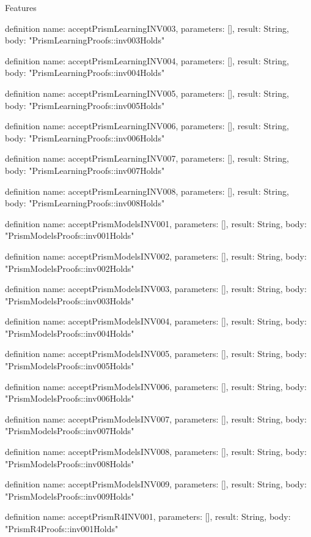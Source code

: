 \begin{lexlean}{Features}
\begin{semanticmodule}
definition{
  name: acceptPrismLearningINV003,
  parameters: [],
  result: String,
  body: "PrismLearningProofs::inv003Holds"
}

definition{
  name: acceptPrismLearningINV004,
  parameters: [],
  result: String,
  body: "PrismLearningProofs::inv004Holds"
}

definition{
  name: acceptPrismLearningINV005,
  parameters: [],
  result: String,
  body: "PrismLearningProofs::inv005Holds"
}

definition{
  name: acceptPrismLearningINV006,
  parameters: [],
  result: String,
  body: "PrismLearningProofs::inv006Holds"
}

definition{
  name: acceptPrismLearningINV007,
  parameters: [],
  result: String,
  body: "PrismLearningProofs::inv007Holds"
}

definition{
  name: acceptPrismLearningINV008,
  parameters: [],
  result: String,
  body: "PrismLearningProofs::inv008Holds"
}

definition{
  name: acceptPrismModelsINV001,
  parameters: [],
  result: String,
  body: "PrismModelsProofs::inv001Holds"
}

definition{
  name: acceptPrismModelsINV002,
  parameters: [],
  result: String,
  body: "PrismModelsProofs::inv002Holds"
}

definition{
  name: acceptPrismModelsINV003,
  parameters: [],
  result: String,
  body: "PrismModelsProofs::inv003Holds"
}

definition{
  name: acceptPrismModelsINV004,
  parameters: [],
  result: String,
  body: "PrismModelsProofs::inv004Holds"
}

definition{
  name: acceptPrismModelsINV005,
  parameters: [],
  result: String,
  body: "PrismModelsProofs::inv005Holds"
}

definition{
  name: acceptPrismModelsINV006,
  parameters: [],
  result: String,
  body: "PrismModelsProofs::inv006Holds"
}

definition{
  name: acceptPrismModelsINV007,
  parameters: [],
  result: String,
  body: "PrismModelsProofs::inv007Holds"
}

definition{
  name: acceptPrismModelsINV008,
  parameters: [],
  result: String,
  body: "PrismModelsProofs::inv008Holds"
}

definition{
  name: acceptPrismModelsINV009,
  parameters: [],
  result: String,
  body: "PrismModelsProofs::inv009Holds"
}

definition{
  name: acceptPrismR4INV001,
  parameters: [],
  result: String,
  body: "PrismR4Proofs::inv001Holds"
}


\end{semanticmodule}
\end{lexlean}
